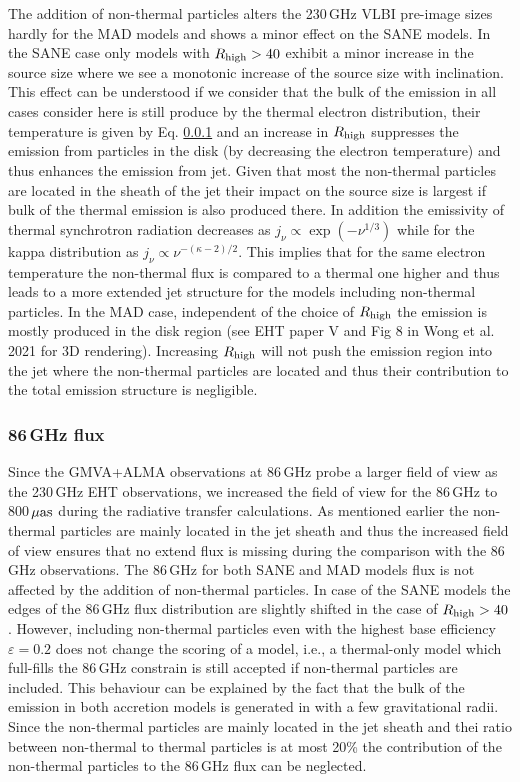 The addition of non-thermal particles alters the 230\,GHz VLBI pre-image sizes hardly for the MAD models and shows a minor effect on the SANE models. In the SANE case only models with $R_{\rm high}>40$ exhibit a minor increase in the source size where we see a monotonic increase of the source size with inclination. This effect can be understood if we consider that the bulk of the emission in all cases consider here is still produce by the thermal electron distribution, their temperature is given by Eq. \ref{} and an increase in $R_{\rm high}$ suppresses the emission from particles in the disk (by decreasing the electron temperature) and thus enhances the emission from jet.
Given that most the non-thermal particles are located in the sheath of the jet their impact on the source size is largest if bulk of the thermal emission is also produced there. In addition the emissivity of thermal synchrotron radiation decreases as $j_{\nu}\propto \exp{\left(-\nu^{1/3}
\right)}$ while for the kappa distribution as $j_{\nu}\propto \nu^{-(\kappa -2)/2}$. This implies that for the same electron temperature the non-thermal flux is compared to a thermal one higher and thus leads to a more extended jet structure for the models including non-thermal particles.
\newline In the MAD case, independent of the choice of $R_{\rm high}$ the emission is mostly produced in the disk region (see EHT paper V and Fig 8 in Wong et al. 2021 for 3D rendering). Increasing $R_{\rm high}$ will not push the emission region into the jet where the non-thermal particles are located and thus their contribution to the total emission structure is negligible.


\subsubsection{86\,GHz flux}
Since the GMVA+ALMA observations at 86\,GHz  probe a larger field of view as the 230\,GHz EHT observations, we increased the field of view for the 86\,GHz to 800\,$\rm{\mu as}$ during the radiative transfer calculations. As mentioned earlier the non-thermal particles are mainly located in the jet sheath and thus the increased field of view ensures that no extend flux is missing during the comparison with the 86\,GHz observations.
\newline The 86\,GHz for both SANE and MAD models flux is not affected by the addition of non-thermal particles. In case of the SANE models the edges of the 86\,GHz flux distribution are slightly shifted in the case of $R_{\rm high}>40$. However, including non-thermal particles even with the highest base efficiency $\varepsilon=0.2$ does not change the scoring of a model, i.e., a thermal-only model which full-fills the 86\,GHz constrain is still accepted if non-thermal particles are included. This behaviour can be explained by the fact that the bulk of the emission in both accretion models is generated in with a few gravitational radii. Since the non-thermal particles are mainly located in the jet sheath and thei ratio between non-thermal to thermal particles is at most 20\% the contribution of the non-thermal particles to the 86\,GHz flux can be neglected.


